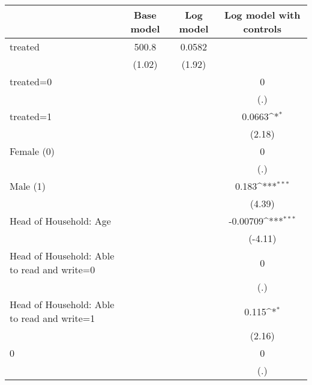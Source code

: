{
\def\sym#1{\ifmmode^{#1}\else\(^{#1}\)\fi}
\begin{tabular}{l*{3}{c}}
\hline\hline
                    &\multicolumn{1}{c}{Base model}&\multicolumn{1}{c}{Log model}&\multicolumn{1}{c}{Log model with controls}\\
\hline
treated             &       500.8         &      0.0582         &                     \\
                    &      (1.02)         &      (1.92)         &                     \\
[1em]
treated=0           &                     &                     &           0         \\
                    &                     &                     &         (.)         \\
[1em]
treated=1           &                     &                     &      0.0663\sym{*}  \\
                    &                     &                     &      (2.18)         \\
[1em]
Female (0)          &                     &                     &           0         \\
                    &                     &                     &         (.)         \\
[1em]
Male (1)            &                     &                     &       0.183\sym{***}\\
                    &                     &                     &      (4.39)         \\
[1em]
Head of Household: Age&                     &                     &    -0.00709\sym{***}\\
                    &                     &                     &     (-4.11)         \\
[1em]
Head of Household: Able to read and write=0&                     &                     &           0         \\
                    &                     &                     &         (.)         \\
[1em]
Head of Household: Able to read and write=1&                     &                     &       0.115\sym{*}  \\
                    &                     &                     &      (2.16)         \\
[1em]
0                   &                     &                     &           0         \\
                    &                     &                     &         (.)         \\

\end{tabular}}
